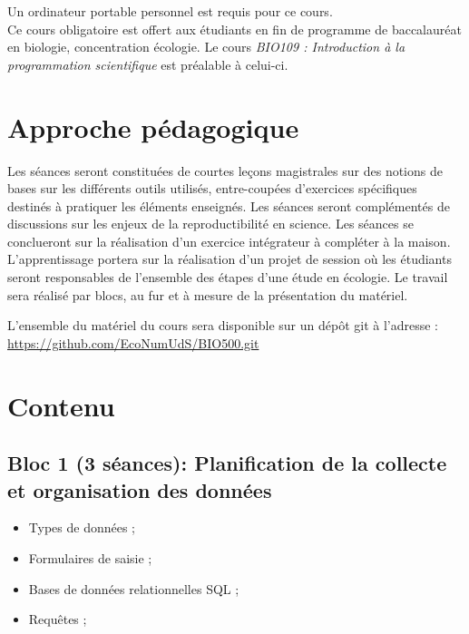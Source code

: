 \documentclass[12]{article}
\begin{document}
	Un ordinateur portable personnel est requis pour ce cours.\\

	Ce cours obligatoire est offert aux étudiants en fin de programme de
	baccalauréat en biologie, concentration écologie. Le cours 
	\textit{BIO109 : Introduction à la programmation scientifique} est préalable à celui-ci.


    \section*{Approche pédagogique} 

	Les séances seront constituées de courtes leçons magistrales sur des notions
	de bases sur les différents outils utilisés, entre-coupées d'exercices
	spécifiques destinés à pratiquer les éléments enseignés. Les séances seront
	complémentés de discussions sur les enjeux de la reproductibilité en science.
	Les séances se conclueront sur la réalisation  d'un exercice intégrateur à
	compléter à la maison. L'apprentissage portera sur la réalisation d'un projet
	de session où les étudiants seront responsables de l'ensemble des étapes d'une
	étude en écologie. Le travail sera réalisé par blocs, au fur et à mesure de la
	présentation du matériel.


	L'ensemble du matériel du cours sera disponible sur un dépôt git à l'adresse :\\
	\url{https://github.com/EcoNumUdS/BIO500.git}

	\section*{Contenu}

	\subsection*{Bloc 1 (3 séances): Planification de la collecte et organisation des données}

	\begin{itemize}
	\renewcommand{\labelitemi}{$\bullet$}	
		\item Types de données ;
		\item Formulaires de saisie ;
		\item Bases de données relationnelles SQL ;
		\item Requêtes ;
	\end{itemize}
\end{document}
